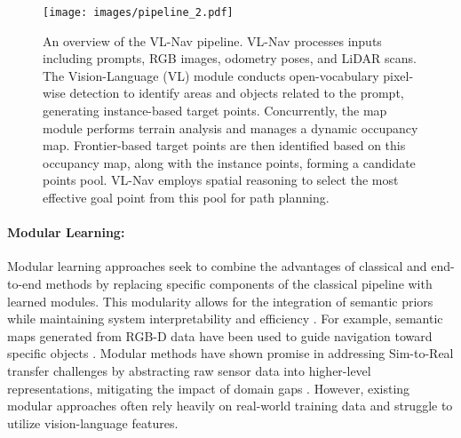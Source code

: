 \begin{figure*}[t]
    \centering
    \texttt{[image: images/pipeline\_2.pdf]} 
    \captionsetup{
    width=\textwidth,
    font=Smallfont,
    labelfont=Smallfont,
    textfont=Smallfont
    }
    \caption{An overview of the VL-Nav pipeline. VL-Nav processes inputs including prompts, RGB images, odometry poses, and LiDAR scans. The Vision-Language (VL) module conducts open-vocabulary pixel-wise detection to identify areas and objects related to the prompt, generating instance-based target points. Concurrently, the map module performs terrain analysis and manages a dynamic occupancy map. Frontier-based target points are then identified based on this occupancy map, along with the instance points, forming a candidate points pool. VL-Nav employs spatial reasoning to select the most effective goal point from this pool for path planning.}
    \label{fig:pipeline}
\end{figure*}

\paragraph{Modular Learning:}
Modular learning approaches seek to combine the advantages of classical and end-to-end methods by replacing specific components of the classical pipeline with learned modules. This modularity allows for the integration of semantic priors while maintaining system interpretability and efficiency \cite{mcallister2017concrete,muller2018driving,chaplot2020learning,chaplot2007object}. For example, semantic maps generated from RGB-D data have been used to guide navigation toward specific objects \cite{chaplot2020object,ramakrishnan2020occupancy,ramakrishnan2022poni,hahn2021no}. Modular methods have shown promise in addressing Sim-to-Real transfer challenges by abstracting raw sensor data into higher-level representations, mitigating the impact of domain gaps \cite{muller2018driving, chaplot2007object, chaplot2020learning}. However, existing modular approaches often rely heavily on real-world training data and struggle to utilize vision-language features.

